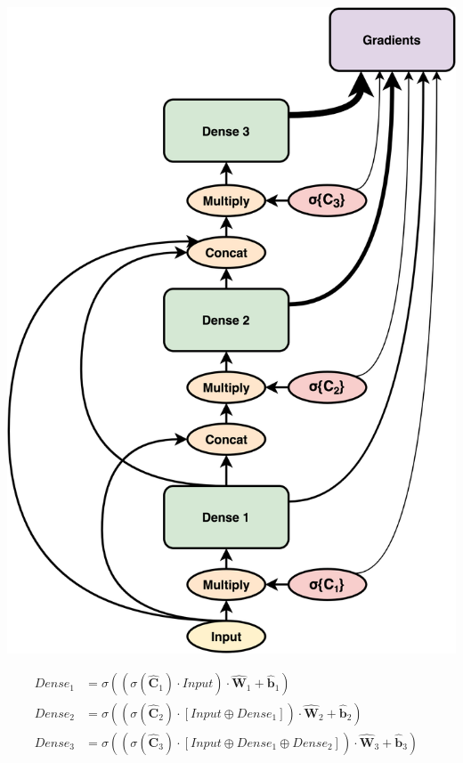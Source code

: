 \usepackage{}\documentclass{article}
\let\oldhat\hat
\renewcommand{\hat}[1]{\oldhat{\mathbf{#1}}}
\begin{document}
\noindent\begin{minipage}{.45\textwidth}
   \centering
   \includegraphics[scale=0.09]{DSC.png}
   \label{fig:DSC.png}
\end{minipage}
\begin{minipage}{.45\textwidth}
\begin{equation}
\label{eq:dsc_math_representation}
\begin{aligned}
   Dense_{1} &= \sigma((\sigma(\hat{C}_{1}) \cdot Input) \cdot \hat{W}_{1} + \hat{b}_{1}) &\\
   Dense_{2} &= \sigma((\sigma(\hat{C}_{2}) \cdot [Input \oplus Dense_{1}]) \cdot \hat{W}_{2} + \hat{b}_{2}) &\\
   Dense_{3} &= \sigma((\sigma(\hat{C}_{3}) \cdot [Input \oplus Dense_{1} \oplus Dense_{2}]) \cdot \hat{W}_{3} + \hat{b}_{3}) 
\end{aligned}
\end{equation}
\end{minipage}
\end{document}
